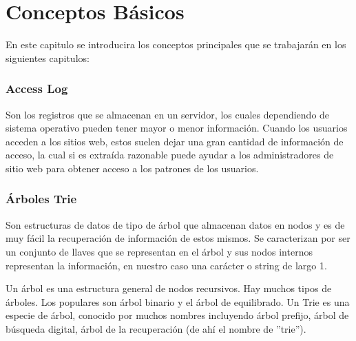 \chapter[Conceptos Básicos]{Conceptos Básicos}
\label{ch:Conceptos-Basicos}





En este capitulo se introducira los conceptos principales que se trabajarán en los siguientes capitulos:




\subsection{Access Log}

Son los registros que se almacenan en un servidor, los cuales dependiendo de sistema operativo pueden tener mayor o menor información. Cuando los usuarios acceden a los sitios web, estos  suelen dejar una gran cantidad de información de acceso, la cual si es extraída razonable puede ayudar a los administradores de sitio web para obtener acceso a los patrones de los usuarios. 


\subsection{Árboles Trie}



Son estructuras de datos de tipo de árbol que almacenan datos en nodos y es de muy fácil la recuperación de información de estos mismos. Se caracterizan por ser un conjunto de llaves que se representan en el árbol y sus nodos internos representan la información, en nuestro caso una carácter o string de largo 1. 

Un árbol es una estructura general de nodos recursivos. Hay muchos tipos de árboles. Los populares son árbol binario y el árbol de equilibrado. Un Trie es una especie de árbol, conocido por muchos nombres incluyendo árbol prefijo, árbol de búsqueda digital, árbol de la recuperación (de ahí el nombre de ''trie'').

